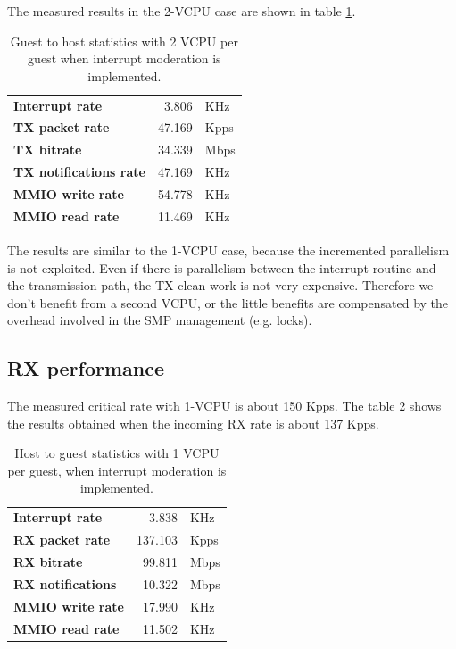 \vspace{0.5cm}

The measured results in the 2-VCPU case are shown in table \ref{tab:e1000-mit-tx-g2h2vcpu}.

\begin{table}
\begin{center}
\begin{tabular}{lrl}
\toprule
\textbf{Interrupt rate} & 3.806 & KHz\\
\textbf{TX packet rate} & 47.169 & Kpps\\
\textbf{TX bitrate} & 34.339 & Mbps\\
\textbf{TX notifications rate} & 47.169 & KHz\\
\textbf{MMIO write rate} & 54.778 & KHz\\
\textbf{MMIO read rate} & 11.469 & KHz\\
\bottomrule
\end{tabular}
\end{center}
\caption{Guest to host statistics with 2 VCPU per guest when interrupt moderation is implemented.}
\label{tab:e1000-mit-tx-g2h2vcpu}
\end{table}

The results are similar to the 1-VCPU case, because the incremented parallelism is not exploited. Even if there is parallelism
between the interrupt routine and the transmission path, the TX clean work is not very expensive. Therefore we don't benefit from a second 
VCPU, or the little benefits are compensated by the overhead involved in the SMP management (e.g. locks).


\subsection{RX performance}
The measured critical rate with 1-VCPU is about 150 Kpps.
The table \ref{tab:e1000-mit-rx-g2h1vcpu} shows the results obtained when the incoming RX rate is about 137 Kpps.

\begin{table}
\begin{center}
\begin{tabular}{lrl}
\toprule
\textbf{Interrupt rate} & 3.838 & KHz\\
\textbf{RX packet rate} & 137.103 & Kpps\\
\textbf{RX bitrate} & 99.811 & Mbps\\
\textbf{RX notifications} & 10.322 & Mbps\\
\textbf{MMIO write rate} & 17.990 & KHz\\
\textbf{MMIO read rate} & 11.502 & KHz\\
\bottomrule
\end{tabular}
\end{center}
\caption{Host to guest statistics with 1 VCPU per guest, when interrupt moderation is implemented.}
\label{tab:e1000-mit-rx-g2h1vcpu}
\end{table}

